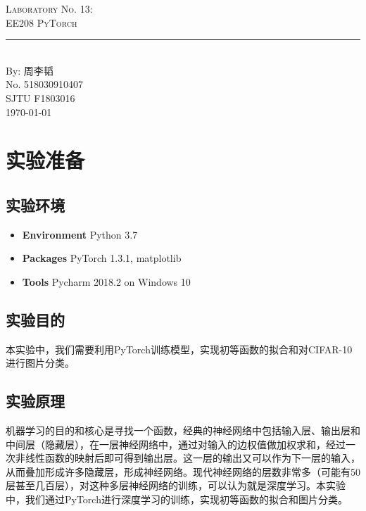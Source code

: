 \documentclass{article}
\newcommand{\labno}{13}
\newcommand{\labtitle}{EE208 PyTorch}
\newcommand{\authorname}{周李韬}
\newcommand{\studentno}{518030910407}
\newcommand{\classno}{F1803016}
\begin{document}
\begin{center}
{\LARGE \textsc{Laboratory No. \labno:} \\ \vspace{4pt}}
{\Large \textsc{\labtitle} \\ \vspace{4pt}} 
\rule[13pt]{\textwidth}{1pt} \\ \vspace{15pt}
{\large By: \authorname \\ \vspace{10pt}
No. \studentno \\ \vspace{10pt}
SJTU \classno \\ \vspace{10pt}
\today \vspace{20pt}}
\end{center}



\section{实验准备}

\subsection{实验环境}
\begin{itemize}
\item\textbf{Environment} Python 3.7
\item\textbf{Packages} PyTorch 1.3.1, matplotlib
\item\textbf{Tools} Pycharm 2018.2 on Windows 10
\end{itemize}

\subsection{实验目的}

本实验中，我们需要利用PyTorch训练模型，实现初等函数的拟合和对CIFAR-10进行图片分类。

\subsection{实验原理}
机器学习的目的和核心是寻找一个函数，经典的神经网络中包括输入层、输出层和中间层（隐藏层），在一层神经网络中，通过对输入的边权值做加权求和，经过一次非线性函数的映射后即可得到输出层。这一层的输出又可以作为下一层的输入，从而叠加形成许多隐藏层，形成神经网络。现代神经网络的层数非常多（可能有50层甚至几百层），对这种多层神经网络的训练，可以认为就是深度学习。本实验中，我们通过PyTorch进行深度学习的训练，实现初等函数的拟合和图片分类。
\end{document}
